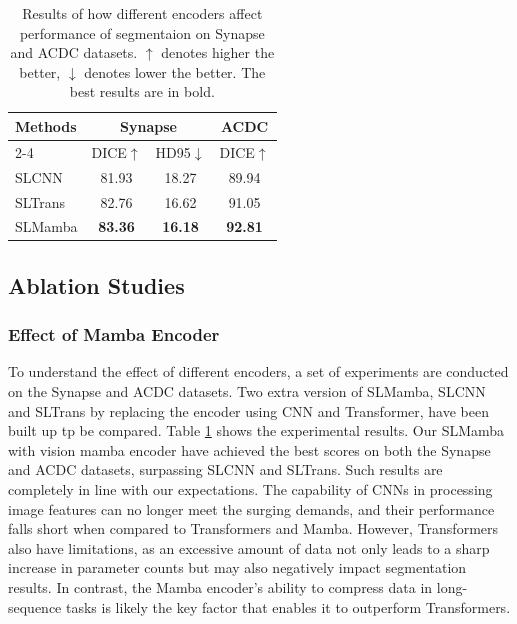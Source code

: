\documentclass[runningheads]{llncs}
\begin{document}
\begin{table}[h]
\small
\centering
\begin{tabular}{l|cc|c}\hline
\multirow{2}{*}{Methods} & \multicolumn{2}{c|}{Synapse} & ACDC \\\cline{2-4}
& DICE$\uparrow$ & HD95$\downarrow$ & DICE$\uparrow$ \\\hline
SLCNN & 81.93 &18.27& 89.94\\
SLTrans & 82.76 & 16.62 & 91.05\\\hline
SLMamba & \textbf{83.36} & \textbf{16.18} & \textbf{92.81} \\\hline
\end{tabular}
\caption{Results of how different encoders affect performance of segmentaion on Synapse and ACDC datasets. $\uparrow$ denotes higher the better, $\downarrow$ denotes lower the better. The best results are in bold.}
\label{table3}
\end{table}

\subsection{Ablation Studies}


\subsubsection{Effect of Mamba Encoder}

To understand the effect of different encoders, a set of experiments are conducted on the Synapse and ACDC datasets. Two extra version of SLMamba, SLCNN and SLTrans by replacing the encoder using CNN and Transformer, have been built up tp be compared. Table \textcolor{red}{\ref{table3}} shows the experimental results. Our SLMamba with vision mamba encoder have achieved the best scores on both the Synapse and ACDC datasets, surpassing SLCNN and SLTrans. Such results are completely in line with our expectations. The capability of CNNs in processing image features can no longer meet the surging demands, and their performance falls short when compared to Transformers and Mamba. However, Transformers also have limitations, as an excessive amount of data not only leads to a sharp increase in parameter counts but may also negatively impact segmentation results. In contrast, the Mamba encoder's ability to compress data in long-sequence\cite{yu2024mambaout} tasks is likely the key factor that enables it to outperform Transformers.
\end{document}
